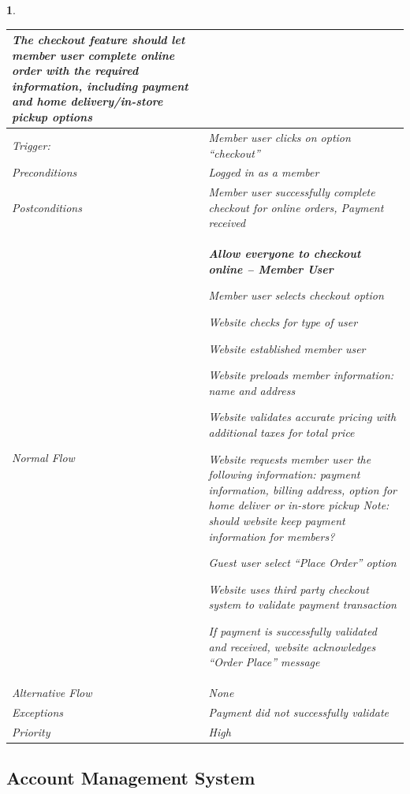 \documentclass{scrreprt}
\theoremstyle{funreq}
\newtheorem{funreq}{}
\begin{document}
\begin{funreq}
\begin{table}[htb!]
{\begin{tabularx}{\columnwidth}{|l|X|}
					The checkout feature should let member user complete online order with the required information, including payment and home delivery/in-store pickup options
					\\ \hline
					Trigger:         & Member user clicks on option “checkout”                    \\ \hline
					Preconditions    & Logged in as a member                                       \\ \hline
					Postconditions   & Member user successfully complete checkout for online orders, Payment received\\ \hline
					Normal Flow &
					\bfseries{Allow everyone to checkout online – Member User}\normalfont\newline 
					
					Member user selects checkout option
					
					Website checks for type of user
					
					Website established member user
					
					Website preloads member information: name and address
					
					Website validates accurate pricing with additional taxes for total price
					
					Website requests member user the following information: payment information, billing address, option for home deliver or in-store pickup \textit{Note: should website keep payment information for member}s?
					
					Guest user select “Place Order” option
					
					Website uses third party checkout system to validate payment transaction
					
					If payment is successfully validated and received, website acknowledges “Order Place” message\\ \hline
					
					Alternative Flow & None                                       \\ \hline
					Exceptions       & Payment did not successfully validate \\ \hline
					Priority & High                                       \\ \hline
				\end{tabularx}%
			}
		\end{table}
	\end{funreq}

	\subsection{Account Management System}
\end{document}
